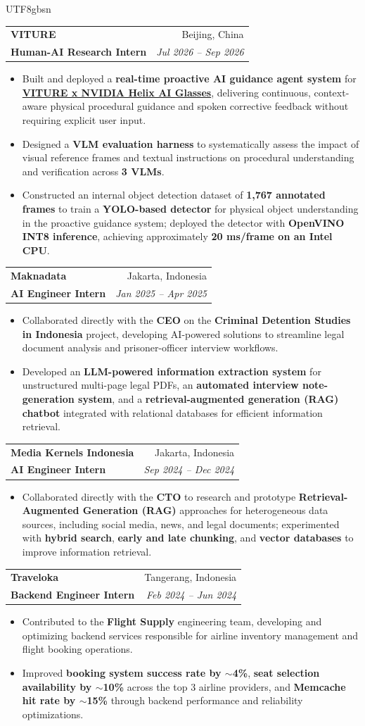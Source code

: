 \documentclass[letterpaper,11pt]{article}
\makeatletter
\newcommand{\resumeItem}[1]{
  \item\small{
    {#1 \vspace{0pt}}
  }
}
\newcommand{\resumeSubheading}[4]{
  \vspace{0pt}\item
    \begin{tabularx}{\linewidth}[t]{>{\raggedright\arraybackslash}Xr@{}}
      \textbf{#1} & #2 \\
      \textbf{\small#3} & \textit{\small #4} \\
    \end{tabularx}\vspace{0pt}
}
\newcommand{\resumeItemListStart}{\begin{itemize}[itemsep=0pt, parsep=0pt, topsep=0pt]}
\newcommand{\resumeItemListEnd}{\end{itemize}\vspace{0pt}}
\makeatother
\begin{document}
\begin{CJK*}{UTF8}{gbsn}
  \resumeSubheading{VITURE}{Beijing, China}{Human-AI Research Intern}{Jul 2026 -- Sep 2026}
    \resumeItemListStart
      \resumeItem{Built and deployed a \textbf{real-time proactive AI guidance agent system} for \textbf{\href{https://www.viture.com/helix}{VITURE x NVIDIA Helix AI Glasses}}, delivering continuous, context-aware physical procedural guidance and spoken corrective feedback without requiring explicit user input.}
      \resumeItem{Designed a \textbf{VLM evaluation harness} to systematically assess the impact of visual reference frames and textual instructions on procedural understanding and verification across \textbf{3 VLMs}.}
      \resumeItem{Constructed an internal object detection dataset of \textbf{1,767 annotated frames} to train a \textbf{YOLO-based detector} for physical object understanding in the proactive guidance system; deployed the detector with \textbf{OpenVINO INT8 inference}, achieving approximately \textbf{20 ms/frame on an Intel CPU}.}
    \resumeItemListEnd

  \resumeSubheading{Maknadata}{Jakarta, Indonesia}
    {AI Engineer Intern}{Jan 2025 -- Apr 2025}
    \resumeItemListStart
      \resumeItem{Collaborated directly with the \textbf{CEO} on the \textbf{Criminal Detention Studies in Indonesia} project, developing AI-powered solutions to streamline legal document analysis and prisoner-officer interview workflows.}
      \resumeItem{Developed an \textbf{LLM-powered information extraction system} for unstructured multi-page legal PDFs, an \textbf{automated interview note-generation system}, and a \textbf{retrieval-augmented generation (RAG) chatbot} integrated with relational databases for efficient information retrieval.}
    \resumeItemListEnd

  \resumeSubheading{Media Kernels Indonesia}{Jakarta, Indonesia}
    {AI Engineer Intern}{Sep 2024 -- Dec 2024}
    \resumeItemListStart
      \resumeItem{Collaborated directly with the \textbf{CTO} to research and prototype \textbf{Retrieval-Augmented Generation (RAG)} approaches for heterogeneous data sources, including social media, news, and legal documents; experimented with \textbf{hybrid search}, \textbf{early and late chunking}, and \textbf{vector databases} to improve information retrieval.}
    \resumeItemListEnd
  
  \resumeSubheading{Traveloka}{Tangerang, Indonesia}
    {Backend Engineer Intern}{Feb 2024 -- Jun 2024}
    \resumeItemListStart
      \resumeItem{Contributed to the \textbf{Flight Supply} engineering team, developing and optimizing backend services responsible for airline inventory management and flight booking operations.}
      \resumeItem{Improved \textbf{booking system success rate by $\sim$4\%}, \textbf{seat selection availability by $\sim$10\%} across the top 3 airline providers, and \textbf{Memcache hit rate by $\sim$15\%} through backend performance and reliability optimizations.}
    \resumeItemListEnd



\end{CJK*}
\end{document}
